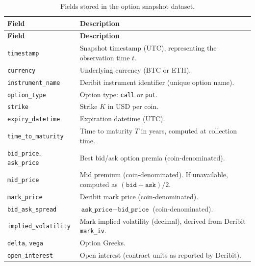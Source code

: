 \documentclass[a4paper,titlepage,12pt]{report}
\theoremstyle{plain}
\begin{document}
\begin{longtable}{@{}p{}p{}@{}}
\caption{Fields stored in the option snapshot dataset.}\label{tab:option_fields}\\
\toprule
\textbf{Field} & \textbf{Description} \\
\midrule
\endfirsthead
\toprule
\textbf{Field} & \textbf{Description} \\
\midrule
\endhead
\bottomrule
\endfoot

\texttt{timestamp} &
Snapshot timestamp (UTC), representing the observation time $t$. \\

\texttt{currency} &
Underlying currency (BTC or ETH). \\

\texttt{instrument\_name} &
Deribit instrument identifier (unique option name). \\

\texttt{option\_type} &
Option type: \texttt{call} or \texttt{put}. \\

\texttt{strike} &
Strike $K$ in USD per coin. \\

\texttt{expiry\_datetime} &
Expiration datetime (UTC). \\

\texttt{time\_to\_maturity} &
Time to maturity $T$ in years, computed at collection time. \\

\texttt{bid\_price}, \texttt{ask\_price} &
Best bid/ask option premia (coin-denominated). \\

\texttt{mid\_price} &
Mid premium (coin-denominated). If unavailable, computed as $(\texttt{bid}+\texttt{ask})/2$. \\

\texttt{mark\_price} &
Deribit mark price (coin-denominated). \\

\texttt{bid\_ask\_spread} &
$\texttt{ask\_price} - \texttt{bid\_price}$ (coin-denominated). \\

\texttt{implied\_volatility} &
Mark implied volatility (decimal), derived from Deribit \texttt{mark\_iv}. \\

\texttt{delta}, \texttt{vega} &
Option Greeks. \\

\texttt{open\_interest} &
Open interest (contract units as reported by Deribit). \\


\end{longtable}
\end{document}
